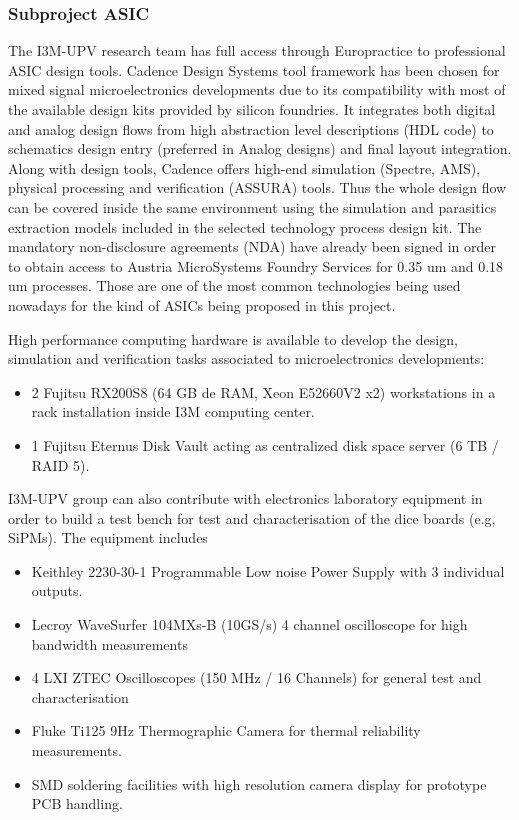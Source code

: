 \subsubsection*{Subproject ASIC}

The I3M-UPV research team has full access through Europractice to professional ASIC design tools. Cadence Design Systems tool framework has been chosen for mixed signal microelectronics developments due to its compatibility with most of the available design kits provided by silicon foundries. It integrates both digital and analog design flows from high abstraction level descriptions (HDL code) to schematics design entry (preferred in Analog designs) and final layout integration. Along with design tools, Cadence offers high-end simulation (Spectre, AMS), physical processing and verification (ASSURA) tools. Thus the whole design flow can be covered inside the same environment using the simulation and parasitics extraction models included in the selected technology process design kit. The mandatory non-disclosure agreements (NDA) have already been signed in order to obtain access to Austria MicroSystems Foundry Services for 0.35 um and 0.18 um processes. Those are one of the most common technologies being used nowadays for the kind of ASICs being proposed in this project.

\par High performance computing hardware is available to develop the design, simulation and verification tasks associated to microelectronics developments:
\begin{itemize}
 \item 2 Fujitsu RX200S8 (64 GB de RAM, Xeon E52660V2 x2) workstations in a rack installation inside I3M computing center.
 \item 1 Fujitsu Eternus Disk Vault acting as centralized disk space server (6 TB / RAID 5).
\end{itemize}

\par I3M-UPV group can also contribute with electronics laboratory equipment in order to build a test bench for test and characterisation of the dice boards (e.g, SiPMs). The equipment includes
\begin{itemize}
 \item Keithley 2230-30-1 Programmable Low noise Power Supply with 3 individual outputs.
 \item Lecroy WaveSurfer 104MXs-B (10GS/s) 4 channel oscilloscope for high bandwidth measurements
 \item 4 LXI ZTEC Oscilloscopes (150 MHz / 16 Channels) for general test and characterisation
 \item Fluke Ti125 9Hz Thermographic Camera for thermal reliability measurements.
 \item SMD soldering facilities with high resolution camera display for prototype PCB handling.
\end{itemize}

